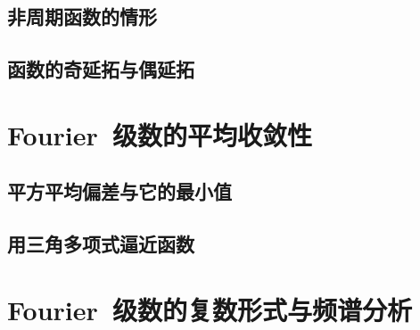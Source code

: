 \subsection{非周期函数的情形}
\subsection{函数的奇延拓与偶延拓}
\begin{exercise}

\end{exercise}
\section{Fourier~级数的平均收敛性}
\subsection{平方平均偏差与它的最小值}
\subsection{用三角多项式逼近函数}
\begin{exercise}

\end{exercise}
\section{Fourier~级数的复数形式与频谱分析}
\begin{exercise*}

\end{exercise*}




\endinput
